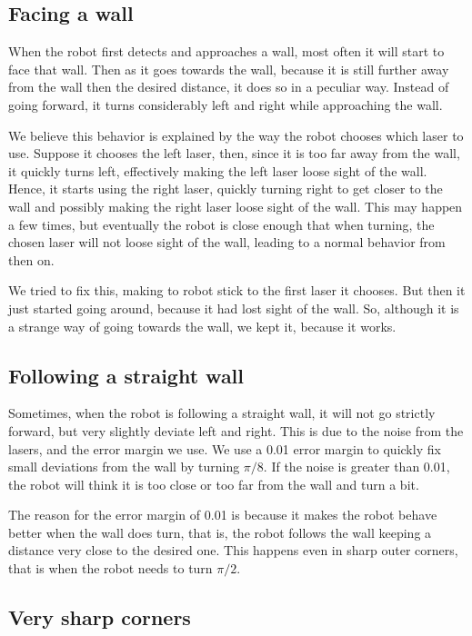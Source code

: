 \documentclass[10pt,journal,compsoc]{IEEEtran}
\begin{document}
\subsection{Facing a wall}

When the robot first detects and approaches a wall, most often it will start to face that wall. Then as it goes towards the wall, because it is still further away from the wall then the desired distance, it does so in a peculiar way. Instead of going forward, it turns considerably left and right while approaching the wall.

We believe this behavior is explained by the way the robot chooses which laser to use. Suppose it chooses the left laser, then, since it is too far away from the wall, it quickly turns left, effectively making the left laser loose sight of the wall. Hence, it starts using the right laser, quickly turning right to get closer to the wall and possibly making the right laser loose sight of the wall. This may happen a few times, but eventually the robot is close enough that when turning, the chosen laser will not loose sight of the wall, leading to a normal behavior from then on.

We tried to fix this, making to robot stick to the first laser it chooses. But then it just started going around, because it had lost sight of the wall. So, although it is a strange way of going towards the wall, we kept it, because it works.

\subsection{Following a straight wall}

Sometimes, when the robot is following a straight wall, it will not go strictly forward, but very slightly deviate left and right. This is due to the noise from the lasers, and the error margin we use. We use a 0.01 error margin to quickly fix small deviations from the wall by turning $\pi/8$. If the noise is greater than 0.01, the robot will think it is too close or too far from the wall and turn a bit.

The reason for the error margin of 0.01 is because it makes the robot behave better when the wall does turn, that is, the robot follows the wall keeping a distance very close to the desired one. This happens even in sharp outer corners, that is when the robot needs to turn $\pi/2$.

\subsection{Very sharp corners}
\end{document}

